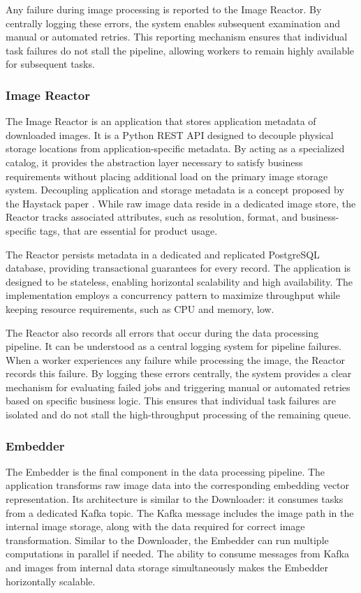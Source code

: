 Any failure during image processing is reported to the Image Reactor. By centrally logging these errors, the system enables subsequent examination and manual or automated retries. This reporting mechanism ensures that individual task failures do not stall the pipeline, allowing workers to remain highly available for subsequent tasks.

\subsubsection{Image Reactor}
The Image Reactor is an application that stores application metadata of downloaded images. It is a Python REST API designed to decouple physical storage locations from application-specific metadata. By acting as a specialized catalog, it provides the abstraction layer necessary to satisfy business requirements without placing additional load on the primary image storage system. Decoupling application and storage metadata is a concept proposed by the Haystack paper \cite{brewer_cap_2012}. While raw image data reside in a dedicated image store, the Reactor tracks associated attributes, such as resolution, format, and business-specific tags, that are essential for product usage.

The Reactor persists metadata in a dedicated and replicated PostgreSQL database, providing transactional guarantees for every record. The application is designed to be stateless, enabling horizontal scalability and high availability. The implementation employs a concurrency pattern to maximize throughput while keeping resource requirements, such as CPU and memory, low.

The Reactor also records all errors that occur during the data processing pipeline. It can be understood as a central logging system for pipeline failures. When a worker experiences any failure while processing the image, the Reactor records this failure. By logging these errors centrally, the system provides a clear mechanism for evaluating failed jobs and triggering manual or automated retries based on specific business logic. This ensures that individual task failures are isolated and do not stall the high-throughput processing of the remaining queue.

\subsubsection{Embedder}
The Embedder is the final component in the data processing pipeline. The application transforms raw image data into the corresponding embedding vector representation. Its architecture is similar to the Downloader: it consumes tasks from a dedicated Kafka topic. The Kafka message includes the image path in the internal image storage, along with the data required for correct image transformation. Similar to the Downloader, the Embedder can run multiple computations in parallel if needed. The ability to consume messages from Kafka and images from internal data storage simultaneously makes the Embedder horizontally scalable.  

